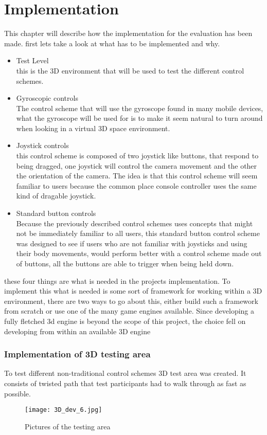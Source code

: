 \chapter{Implementation}
This chapter will describe how the implementation for the evaluation has been made. first lets take a look at what has to be implemented and why.
\begin{itemize}
\item Test Level\\
this is the 3D environment that will be used to test the different control schemes. 
\item Gyroscopic controls\\
The control scheme that will use the gyroscope found in many mobile devices, what the gyroscope will be used for is to make it seem natural to turn around when looking in a virtual 3D space environment. 
\item Joystick controls\\
this control scheme is composed of two joystick like buttons, that respond to being dragged, one joystick will control the camera movement and the other the orientation of the camera. The idea is that this control scheme will seem familiar%
to users because the common place console controller uses the same kind of dragable joystick.
\item Standard button controls\\
Because the previously described control schemes uses concepts that might not be immediately familiar to all users, this standard button control scheme was designed to see if users who are not familiar with joysticks and using their body movements, would perform better with a control scheme made out of buttons, all the buttons are able to trigger when being held down.
\end{itemize}
these four things are what is needed in the projects implementation. To implement this what is needed is some sort of framework for working within a 3D environment, there are two ways to go about this, either build such a framework from scratch or use one of the many game engines available. Since developing a fully fletched 3d engine is beyond the scope of this project, the choice fell on developing from within an available 3D engine

\subsection{Implementation of 3D testing area}
To test different non-traditional control schemes 3D test area was created. It consists of twisted path that test participants had to walk through as fast as possible.
\begin{figure}[H]
\centering
\texttt{[image: 3D\_dev\_6.jpg]}
\caption{Pictures of the testing area}
\end{figure}

